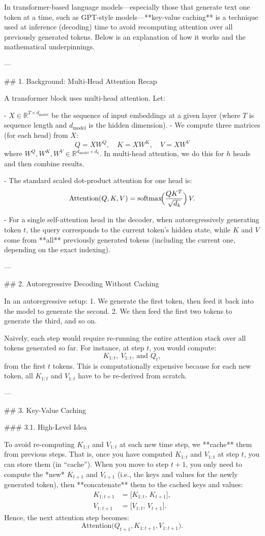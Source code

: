 In transformer-based language models—especially those that generate text one token at a time, such as GPT-style models—**key-value caching** is a technique used at inference (decoding) time to avoid recomputing attention over all previously generated tokens. Below is an explanation of how it works and the mathematical underpinnings.

---

## 1. Background: Multi-Head Attention Recap

A transformer block uses multi-head attention. Let:

- \(X \in \mathbb{R}^{T \times d_\text{model}}\) be the sequence of input embeddings at a given layer (where \(T\) is sequence length and \(d_\text{model}\) is the hidden dimension).
- We compute three matrices (for each head) from \(X\):
  \[
  Q = XW^Q,\quad
  K = XW^K,\quad
  V = XW^V
  \]
  where \(W^Q, W^K, W^V \in \mathbb{R}^{d_\text{model} \times d_k}\). In multi-head attention, we do this for \(h\) heads and then combine results.

- The standard scaled dot-product attention for one head is:
  \[
  \text{Attention}(Q, K, V) 
  = \text{softmax}\!\Bigl(\frac{QK^T}{\sqrt{d_k}}\Bigr)\, V.
  \]

- For a single self-attention head in the decoder, when autoregressively generating token \(t\), the query corresponds to the current token’s hidden state, while \(K\) and \(V\) come from **all** previously generated tokens (including the current one, depending on the exact indexing).

---

## 2. Autoregressive Decoding Without Caching

In an autoregressive setup:
1. We generate the first token, then feed it back into the model to generate the second.
2. We then feed the first two tokens to generate the third, and so on.

Naively, each step would require re-running the entire attention stack over all tokens generated so far. For instance, at step \(t\), you would compute:
\[
K_{1:t},\ V_{1:t},\ \text{and } Q_t,
\]
from the first \(t\) tokens. This is computationally expensive because for each new token, all \(K_{1:t}\) and \(V_{1:t}\) have to be re-derived from scratch.

---

## 3. Key-Value Caching

### 3.1. High-Level Idea

To avoid re-computing \(K_{1:t}\) and \(V_{1:t}\) at each new time step, we **cache** them from previous steps. That is, once you have computed \(K_{1:t}\) and \(V_{1:t}\) at step \(t\), you can store them (in “cache”). When you move to step \(t+1\), you only need to compute the *new* \(K_{t+1}\) and \(V_{t+1}\) (i.e., the keys and values for the newly generated token), then **concatenate** them to the cached keys and values:
\[
\begin{aligned}
K_{1:t+1} &= \bigl[K_{1:t},\, K_{t+1}\bigr], \\
V_{1:t+1} &= \bigl[V_{1:t},\, V_{t+1}\bigr].
\end{aligned}
\]
Hence, the next attention step becomes:
\[
\text{Attention}\bigl(Q_{t+1}, K_{1:t+1}, V_{1:t+1}\bigr).
\]

